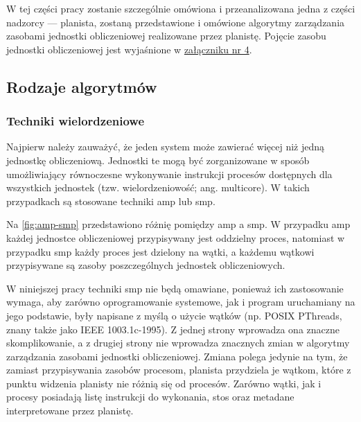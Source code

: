 \documentclass[../../main]{subfiles}
\begin{document}
W tej części pracy zostanie szczególnie omówiona i przeanalizowana jedna z części nadzorcy — planista, zostaną przedstawione i omówione algorytmy zarządzania zasobami jednostki obliczeniowej realizowane przez planistę. Pojęcie zasobu jednostki obliczeniowej jest wyjaśnione w \hyperref[sec:zalacznik-4]{załączniku nr 4}.

\subsection{Rodzaje algorytmów}

\subsubsection{Techniki wielordzeniowe}

Najpierw należy zauważyć, że jeden system może zawierać więcej niż jedną jednostkę obliczeniową. Jednostki te mogą być zorganizowane w sposób umożliwiający równoczesne wykonywanie instrukcji procesów dostępnych dla wszystkich jednostek (tzw. wielordzeniowość; ang. multicore). W takich przypadkach są stosowane techniki \gls{amp} lub \gls{smp}.

Na \cref{fig:amp-smp} przedstawiono różnię pomiędzy \gls{amp} a \gls{smp}. W przypadku \gls{amp} każdej jednostce obliczeniowej przypisywany jest oddzielny proces, natomiast w przypadku \gls{smp} każdy proces jest dzielony na wątki, a każdemu wątkowi przypisywane są zasoby poszczególnych jednostek obliczeniowych.

W niniejszej pracy techniki \gls{smp} nie będą omawiane, ponieważ ich zastosowanie wymaga, aby zarówno oprogramowanie systemowe, jak i program uruchamiany na jego podstawie, były napisane z myślą o użycie wątków (np. POSIX PThreads, znany także jako IEEE 1003.1c-1995). Z jednej strony wprowadza ona znaczne skomplikowanie, a z drugiej strony nie wprowadza znacznych zmian w algorytmy zarządzania zasobami jednostki obliczeniowej. Zmiana polega jedynie na tym, że zamiast przypisywania zasobów procesom, planista przydziela je wątkom, które z punktu widzenia planisty nie różnią się od procesów. Zarówno wątki, jak i procesy posiadają listę instrukcji do wykonania, stos oraz metadane interpretowane przez planistę.
\end{document}
